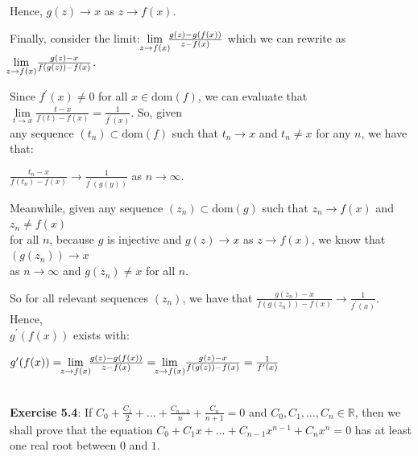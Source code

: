 \documentclass{book}
\newenvironment{myIndent}{%
   \begin{adjustwidth}{2.5em}{0em}%
}{%
   \end{adjustwidth}%
}
\newcommand{\domain}[1]{\mathrm{dom}(#1)}
\newcommand{\mySepTwo}[1][.]{%
   {\noindent\color{#1}{\rule{6.5in}{0.5mm}}}\\%
}
\newcommand{\retTwo}{\hfill\bigbreak}
\begin{document}
{\begin{myIndent}
   Hence, $g(z) \rightarrow x$ as $z \rightarrow f(x)$.\retTwo

   Finally, consider the limit: $\hspace{-0.4em}\lim\limits_{z \rightarrow f(x)}\hspace{-0.4em}{\frac{g(z) - g(f(x))}{z - f(x)}}$ which we can rewrite as $\hspace{-0.4em}\lim\limits_{z \rightarrow f(x)}\hspace{-0.2em}{\frac{g(z) - x}{f(g(z)) - f(x)}}$.\retTwo

   Since $f^\prime(x) \neq 0$ for all $x \in \domain{f}$, we can evaluate that $\lim\limits_{t \rightarrow x}\frac{t-x}{f(t) - f(x)} = \frac{1}{f^\prime(x)}$. So, given\\ any sequence $(t_n) \subset \domain{f}$ such that $t_n \rightarrow x$ and $t_n \neq x$ for any $n$, we have that:
   
   {\centering $\frac{t_n - x}{f(t_n) - f(x)} \rightarrow \frac{1}{f^\prime(g(y))}$ as $n \rightarrow \infty$. \retTwo\par}

   Meanwhile, given any sequence $(z_n) \subset \domain{g}$ such that $z_n \rightarrow f(x)$ and $z_n \neq f(x)$\\ for all $n$, because $g$ is injective and $g(z) \rightarrow x$ as $z \rightarrow f(x)$, we know that $(g(z_n)) \rightarrow x$\\ as $n \rightarrow \infty$ and $g(z_n) \neq x$ for all $n$.

   \newpage

   So for all relevant sequences $(z_n)$, we have that $\frac{g(z_n) - x}{f(g(z_n)) - f(x)} \rightarrow \frac{1}{f^\prime(x)}$. Hence,\\ $g^\prime(f(x))$ exists with:

   {\centering $g^\prime(f(x)) = \hspace{-0.4em}\lim\limits_{z \rightarrow f(x)}\hspace{-0.4em}{\frac{g(z) - g(f(x))}{z - f(x)}} = \hspace{-0.4em}\lim\limits_{z \rightarrow f(x)}\hspace{-0.2em}{\frac{g(z) - x}{f(g(z)) - f(x)}} = \frac{1}{f^\prime(x)}$\retTwo\par}
\end{myIndent}}
   
\mySepTwo[Black]

\textbf{Exercise 5.4}: If $C_0 + \frac{C_1}{2} + \ldots + \frac{C_{n-1}}{n} + \frac{C_n}{n+1} = 0$ and $C_0, C_1, \ldots, C_n \in \mathbb{R}$, then we\\  shall prove that the equation $C_0 + C_1x + \ldots + C_{n-1}x^{n-1} + C_n x^n= 0$ has at least\\ [2pt] one real root between $0$ and $1$.
\end{document}
